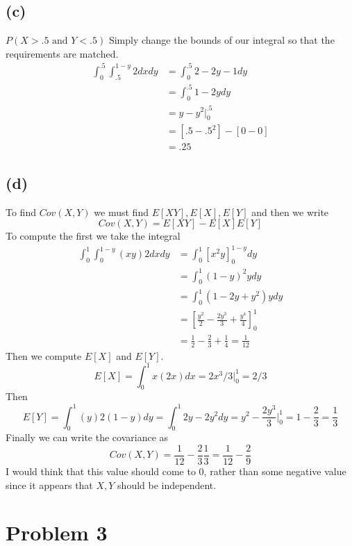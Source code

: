 \documentclass{article}
\theoremstyle{definition}
\begin{document}
\subsection*{(c)}
$P(X > .5 \text{ and } Y < .5)$ Simply change the bounds of our integral so that the requirements are 
matched.
\begin{align*}
    \int_0^{.5} \int_{.5}^{1 - y} 2 dx dy &= \int_0^{.5} 2 - 2y - 1 dy \\
    &= \int_0^{.5} 1 - 2y dy \\
    &= y - y^2 \bigg|_0^{.5}\\
    &= [.5 - .5^2] - [0 - 0] \\
    &= .25
\end{align*}
\subsection*{(d)}
To find $Cov(X,Y)$ we must find $E[XY], E[X], E[Y]$ and then we write 
\[
    Cov(X,Y) = E[XY] - E[X]E[Y]
\]
To compute the first we take the integral 
\begin{align*}
    \int_0^1 \int_0^{1 - y} (xy) 2 dx dy &= \int_0^1 \left[x^2 y\right]_0^{1-y} dy \\
    &= \int_0^1 (1-y)^2 y dy \\
    &= \int_0^1 (1 - 2y + y^2)y dy \\
    &= \left[\frac{y^2}{2} - \frac{2y^3}{3} + \frac{y^4}{4}\right]_0^1 \\
    &= \frac{1}{2} - \frac{2}{3} + \frac{1}{4} = \frac{1}{12}
\end{align*}
Then we compute $E[X]$ and $E[Y]$.
\[
    E[X] = \int_0^1 x (2x) dx = 2x^3 / 3 \bigg|_0^1 = 2 / 3
\]
Then 
\[
    E[Y] = \int_0^1 (y)2(1-y) dy = \int_0^1 2y - 2y^2 dy = y^2 - \frac{2y^3}{3} \bigg|_0^1 = 1 - \frac{2}{3} = \frac{1}{3}
\]
Finally we can write the covariance as
\[
    Cov(X,Y) = \frac{1}{12} - \frac{2}{3}\frac{1}{3} = \frac{1}{12} - \frac{2}{9}
\]
I would think that this value should come to 0, rather than some negative value since it appears that $X,Y$ should be independent.
\section*{Problem 3}
\end{document}
